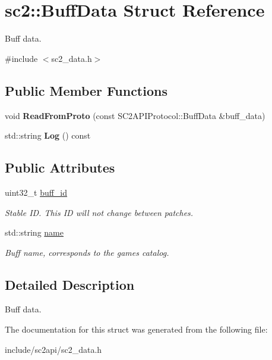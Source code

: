 \hypertarget{structsc2_1_1_buff_data}{}\section{sc2\+:\+:Buff\+Data Struct Reference}
\label{structsc2_1_1_buff_data}


Buff data.  




{\ttfamily \#include $<$sc2\+\_\+data.\+h$>$}

\subsection*{Public Member Functions}
\begin{DoxyCompactItemize}
\item 
\mbox{\label{structsc2_1_1_buff_data_a95a4fae8f7b7ece6fbd9c16ba6bd2b0a}} 
void {\bfseries Read\+From\+Proto} (const S\+C2\+A\+P\+I\+Protocol\+::\+Buff\+Data \&buff\+\_\+data)
\item 
\mbox{\label{structsc2_1_1_buff_data_acd334464556d30678a2f7aaf43265432}} 
std\+::string {\bfseries Log} () const
\end{DoxyCompactItemize}
\subsection*{Public Attributes}
\begin{DoxyCompactItemize}
\item 
\mbox{\label{structsc2_1_1_buff_data_ab5c92fdf01e7eb2d5629df664a99e0bc}} 
uint32\+\_\+t \hyperlink{structsc2_1_1_buff_data_ab5c92fdf01e7eb2d5629df664a99e0bc}{buff\+\_\+id}
\begin{DoxyCompactList}\small\item\em Stable ID. This ID will not change between patches. \end{DoxyCompactList}\item 
\mbox{\label{structsc2_1_1_buff_data_a8b97134b47f6cbe973fe1eba84bc3612}} 
std\+::string \hyperlink{structsc2_1_1_buff_data_a8b97134b47f6cbe973fe1eba84bc3612}{name}
\begin{DoxyCompactList}\small\item\em Buff name, corresponds to the game\textquotesingle{}s catalog. \end{DoxyCompactList}\end{DoxyCompactItemize}


\subsection{Detailed Description}
Buff data. 

The documentation for this struct was generated from the following file\+:\begin{DoxyCompactItemize}
\item 
include/sc2api/sc2\+\_\+data.\+h\end{DoxyCompactItemize}
